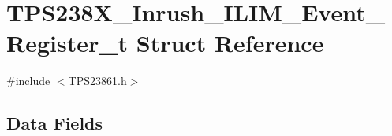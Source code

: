 \hypertarget{struct_t_p_s238_x___inrush___i_l_i_m___event___register__t}{\section{T\-P\-S238\-X\-\_\-\-Inrush\-\_\-\-I\-L\-I\-M\-\_\-\-Event\-\_\-\-Register\-\_\-t Struct Reference}
\label{struct_t_p_s238_x___inrush___i_l_i_m___event___register__t}
}


{\ttfamily \#include $<$T\-P\-S23861.\-h$>$}

\subsection*{Data Fields}
